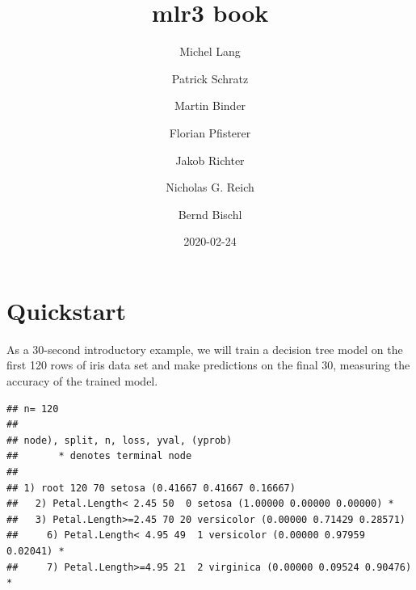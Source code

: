 \documentclass[]{scrbook}
\title{mlr3 book}
\author{Michel Lang \and Patrick Schratz \and Martin Binder \and Florian Pfisterer \and Jakob Richter \and Nicholas G. Reich \and Bernd Bischl}
\date{2020-02-24}
\newenvironment{Shaded}{\begin{snugshade}}{\end{snugshade}}
\newcommand{\CommentTok}[1]{\textcolor[rgb]{0.56,0.35,0.01}{\textit{#1}}}
\newcommand{\DataTypeTok}[1]{\textcolor[rgb]{0.13,0.29,0.53}{#1}}
\newcommand{\DecValTok}[1]{\textcolor[rgb]{0.00,0.00,0.81}{#1}}
\newcommand{\KeywordTok}[1]{\textcolor[rgb]{0.13,0.29,0.53}{\textbf{#1}}}
\newcommand{\NormalTok}[1]{#1}
\newcommand{\OperatorTok}[1]{\textcolor[rgb]{0.81,0.36,0.00}{\textbf{#1}}}
\newcommand{\StringTok}[1]{\textcolor[rgb]{0.31,0.60,0.02}{#1}}
\renewenvironment{Shaded} {\begin{snugshade}\small} {\end{snugshade}}
\begin{document}
\maketitle

{
\hypersetup{linkcolor=}
\setcounter{tocdepth}{1}
\tableofcontents
}
\hypertarget{quickstart}{%
\chapter*{Quickstart}\label{quickstart}}

As a 30-second introductory example, we will train a decision tree model on the first 120 rows of iris data set and make predictions on the final 30, measuring the accuracy of the trained model.

\begin{Shaded}
\end{Shaded}

\begin{verbatim}
## n= 120 
## 
## node), split, n, loss, yval, (yprob)
##       * denotes terminal node
## 
## 1) root 120 70 setosa (0.41667 0.41667 0.16667)  
##   2) Petal.Length< 2.45 50  0 setosa (1.00000 0.00000 0.00000) *
##   3) Petal.Length>=2.45 70 20 versicolor (0.00000 0.71429 0.28571)  
##     6) Petal.Length< 4.95 49  1 versicolor (0.00000 0.97959 0.02041) *
##     7) Petal.Length>=4.95 21  2 virginica (0.00000 0.09524 0.90476) *
\end{verbatim}

\begin{Shaded}
\end{Shaded}
\end{document}
